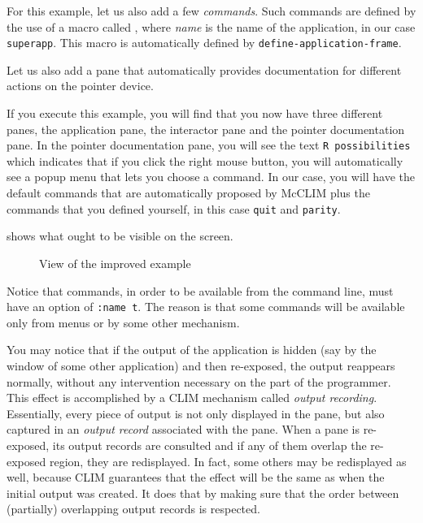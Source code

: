 For this example, let us also add a few \emph{commands}.  Such
commands are defined by the use of a macro called
, where
\textit{name} is the name of the application, in our case
\texttt{superapp}. This macro is automatically defined by
\texttt{define-application-frame}.

Let us also add a pane that automatically provides documentation for
different actions on the pointer device.

If you execute this example, you will find that you now have three
different panes, the application pane, the interactor pane and the
pointer documentation pane.  In the pointer documentation pane, you
will see the text \texttt{R possibilities} which indicates that if you
click the right mouse button, you will automatically see a popup menu
that lets you choose a command.  In our case, you will have the
default commands that are automatically proposed by McCLIM plus the
commands that you defined yourself, in this case \texttt{quit} and
\texttt{parity}.

 shows what ought to be visible on the screen.

\begin{figure}
  \begin{center}
  \end{center}
  \caption{\label{fig-ex2} View of the improved example}
\end{figure}

Notice that commands, in order to be available from the command line,
must have an option of \texttt{:name t}.  The reason is that some
commands will be available only from menus or by some other mechanism.

You may notice that if the output of the application is hidden (say by
the window of some other application) and then re-exposed, the output
reappears normally, without any intervention necessary on the part of
the programmer.  This effect is accomplished by a CLIM mechanism
called \emph{output recording}.  Essentially, every piece of output is
not only displayed in the pane, but also captured in an \emph{output
  record} associated with the pane.  When a pane is re-exposed, its
output records are consulted and if any of them overlap the re-exposed
region, they are redisplayed.  In fact, some others may be redisplayed
as well, because CLIM guarantees that the effect will be the same as
when the initial output was created.  It does that by making sure that
the order between (partially) overlapping output records is respected.

